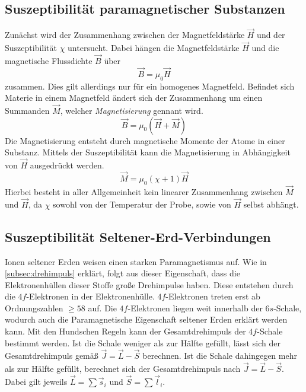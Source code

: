 \subsection{Suszeptibilität paramagnetischer Substanzen}
\label{subsec:Berechnung}

Zunächst wird der Zusammenhang zwischen der Magnetfeldstärke $\vec{H}$ und der Suszeptibilität $\chi$ untersucht. Dabei hängen die Magnetfeldstärke $\vec{H}$ und 
die magnetische Flussdichte $\vec{B}$ über 
\begin{equation*}
    \vec{B} = \mu_0 \vec{H}
\end{equation*}
zusammen. Dies gilt allerdings nur für ein homogenes Magnetfeld. Befindet sich Materie in einem Magnetfeld ändert sich der Zusammenhang um einen Summanden $\vec{M}$, welcher 
\textit{Magnetisierung} gennant wird.
\begin{equation}
    \label{eqn:magnetfeld}
    \vec{B} = \mu_0 \left(\vec{H} + \vec{M}\right)
\end{equation}
Die Magnetisierung entsteht durch magnetische Momente der Atome in einer Substanz. Mittels der Suszeptibilität kann die Magnetisierung in Abhängigkeit von $\vec{H}$
ausgedrückt werden. 
\begin{equation}
    \label{eqn:Mchi}
    \vec{M} = \mu_0 (\chi+1) \vec{H}
\end{equation}
Hierbei besteht in aller Allgemeinheit kein linearer Zusammenhang zwischen $\vec{M}$ und $\vec{H}$, da $\chi$ sowohl von der Temperatur der Probe, sowie von $\vec{H}$ selbst abhängt.

\subsection{Suszeptibilität Seltener-Erd-Verbindungen}
\label{subsec:suzepseltenererden}
Ionen seltener Erden weisen einen starken Paramagnetismus auf. Wie in \autoref{subsec:drehimpuls} erklärt, folgt aus dieser Eigenschaft, dass die Elektronenhüllen dieser Stoffe
große Drehimpulse haben. Diese entstehen durch die $4f$-Elektronen in der Elektronenhülle. $4f$-Elektronen treten erst ab Ordnungszahlen $\geq 58$ auf. Die $4f$-Elektronen liegen weit
innerhalb der $6s$-Schale, wodurch auch die Paramagnetische Eigenschaft seltener Erden erklärt werden kann. Mit den Hundschen Regeln kann der Gesamtdrehimpuls der $4f$-Schale
bestimmt werden. Ist die Schale weniger als zur Hälfte gefüllt, lässt sich der Gesamtdrehimpuls gemäß $\vec{J} = \vec{L} - \vec{S}$ berechnen. Ist die Schale dahingegen 
mehr als zur Hälfte gefüllt, berechnet sich der Gesamtdrehimpuls nach $\vec{J} = \vec{L} - \vec{S}$. Dabei gilt jeweils $\vec{L} = \sum \vec{s}_i$ und $\vec{S} = \sum \vec{l}_i$. 

